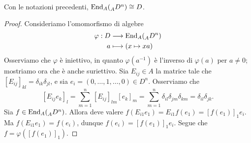 \begin{proposition}
Con le notazioni precedenti, $\operatorname{End}_A(\prescript{}{A}{D}^n)\cong D$.
\end{proposition}
\begin{proof}
Consideriamo l'omomorfismo di algebre
\begin{align*}
\varphi:D&\longrightarrow\operatorname{End}_A(\prescript{}{A}{D}^n)\\
a&\longmapsto(x\mapsto xa)
\end{align*}
Osserviamo che $\varphi$ è iniettivo, in quanto $\varphi(a^{-1})$ è l'inverso di $\varphi(a)$ per $a\neq 0$; mostriamo ora che è anche suriettivo. Sia $E_{ij}\in A$ la matrice tale che $[E_{ij}]_{kl}=\delta_{ik}\delta_{jl}$, e sia $e_i=(0,\ldots,1,\ldots,0)\in D^n$. Osserviamo che
$$
[E_{ij}e_k]_l=\sum_{m=1}^{n}[E_{ij}]_{lm}[e_k]_m=\sum_{m=1}^{n}\delta_{il}\delta_{jm}\delta_{km}=\delta_{il}\delta_{jk}.
$$
Sia $f\in\operatorname{End}_A(\prescript{}{A}{D}^n)$. Allora deve valere $f(E_{i1}e_1)=E_{i1}f(e_1)=[f(e_1)]_1e_i$. Ma $f(E_{i1}e_1)=f(e_i)$, dunque $f(e_i)=[f(e_1)]_1e_i$. Segue che $f=\varphi([f(e_1)]_1)$.
\end{proof}


